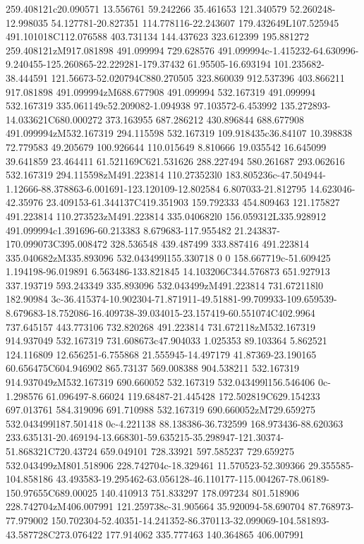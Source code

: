 {259.408121c20.090571 13.556761 59.242266 35.461653 121.340579 52.260248-12.998035 54.127781-20.827351 114.778116-22.243607
179.432649L107.525945 491.101018C112.076588 403.731134 144.437623 323.612399 195.881272 259.408121zM917.081898 491.099994
729.628576 491.099994c-1.415232-64.630996-9.240455-125.260865-22.229281-179.37432 61.95505-16.693194 101.235682-38.444591
121.56673-52.020794C880.270505 323.860039 912.537396 403.866211 917.081898 491.099994zM688.677908 491.099994 532.167319
491.099994 532.167319 335.061149c52.209082-1.094938 97.103572-6.453992 135.272893-14.033621C680.000272 373.163955 687.286212
430.896844 688.677908 491.099994zM532.167319 294.115598 532.167319 109.918435c36.84107 10.398838 72.779583 49.205679 100.926644
110.015649 8.810666 19.035542 16.645099 39.641859 23.464411 61.521169C621.531626 288.227494 580.261687 293.062616 532.167319
294.115598zM491.223814 110.273523l0 183.805236c-47.504944-1.12666-88.378863-6.001691-123.120109-12.802584 6.807033-21.812795
14.623046-42.35976 23.409153-61.344137C419.351903 159.792333 454.809463 121.175827 491.223814 110.273523zM491.223814 335.040682l0
156.059312L335.928912 491.099994c1.391696-60.213383 8.679683-117.955482 21.243837-170.099073C395.008472 328.536548 439.487499
333.887416 491.223814 335.040682zM335.893096 532.043499l155.330718 0 0 158.667719c-51.609425 1.194198-96.019891
6.563486-133.821845 14.103206C344.576873 651.927913 337.193719 593.243349 335.893096 532.043499zM491.223814 731.672118l0 182.90984
3c-36.415374-10.902304-71.871911-49.51881-99.709933-109.659539-8.679683-18.752086-16.409738-39.034015-23.157419-60.551074C402.9964
 737.645157 443.773106 732.820268 491.223814 731.672118zM532.167319 914.937049 532.167319 731.608673c47.904033 1.025353 89.103364
5.862521 124.116809 12.656251-6.755868 21.555945-14.497179 41.87369-23.190165 60.656475C604.946902 865.73137 569.008388
904.538211 532.167319 914.937049zM532.167319 690.660052 532.167319 532.043499l156.546406 0c-1.298576 61.096497-8.66024
119.68487-21.445428 172.502819C629.154233 697.013761 584.319096 691.710988 532.167319 690.660052zM729.659275
532.043499l187.501418 0c-4.221138 88.138386-36.732599 168.973436-88.620363
233.635131-20.469194-13.668301-59.635215-35.298947-121.30374-51.868321C720.43724 659.049101 728.33921 597.585237 729.659275
532.043499zM801.518906 228.742704c-18.329461 11.570523-52.309366 29.355585-104.858186
43.493583-19.295462-63.056128-46.110177-115.004267-78.06189-150.97655C689.00025 140.410913 751.833297 178.097234 801.518906
228.742704zM406.007991 121.259738c-31.905664 35.920094-58.690704 87.768973-77.979002
150.702304-52.40351-14.241352-86.370113-32.099069-104.581893-43.587728C273.076422 177.914062 335.777463 140.364865 406.007991
}
